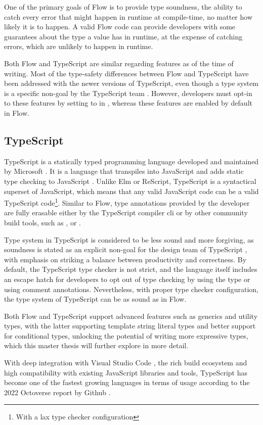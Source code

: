 One of the primary goals of Flow is to provide type soundness, the ability to catch every error that might happen in runtime at compile-time, no matter how likely it is to happen. A valid Flow code can provide developers with some guarantees about the type a value has in runtime, at the expense of catching errors, which are unlikely to happen in runtime.

Both Flow and TypeScript are similar regarding features as of the time of writing. Most of the type-safety differences between Flow and TypeScript have been addressed with the newer versions of TypeScript, even though a  type system is a specific non-goal by the TypeScript team \cite{TypeScriptDesignGoals}. However, developers must opt-in to these features by setting  to  in , whereas these features are enabled by default in Flow.

\subsection{TypeScript}

TypeScript is a statically typed programming language developed and maintained by Microsoft \cite{TypeScriptJavaScriptSyntax}. It is a language that transpiles into JavaScript and adds static type checking to JavaScript \cite{DocumentationTypeScriptJavaScript}. Unlike Elm or ReScript, TypeScript is a syntactical superset of JavaScript, which means that any valid JavaScript code can be a valid TypeScript code\footnote{With a lax type checker configuration}. Similar to Flow, type annotations provided by the developer are fully erasable either by the TypeScript compiler \acrshort{cli} or by other community build tools, such as \cite{BabelBabel2023}, \cite{EsbuildExtremelyFast} or \cite{SWCRustbasedPlatform}.

Type system in TypeScript is considered to be less sound and more forgiving, as soundness is stated as an explicit non-goal for the design team of TypeScript \cite{TypeScriptDesignGoals}, with emphasis on striking a balance between productivity and correctness. By default, the TypeScript type checker is not strict, and the language itself includes an escape hatch for developers to opt out of type checking by using the  type or using  comment annotations. Nevertheless, with proper type checker configuration, the type system of TypeScript can be as sound as in Flow.

Both Flow and TypeScript support advanced features such as generics and utility types, with the latter supporting template string literal types and better support for conditional types, unlocking the potential of writing more expressive types, which this master thesis will further explore in more detail.

With deep integration with Visual Studio Code \cite{VisualStudioCode}, the rich build ecosystem and high compatibility with existing JavaScript libraries and tools, TypeScript has become one of the fastest growing languages in terms of usage according to the 2022 Octoverse report by Github \cite{Octoverse2022State}.
